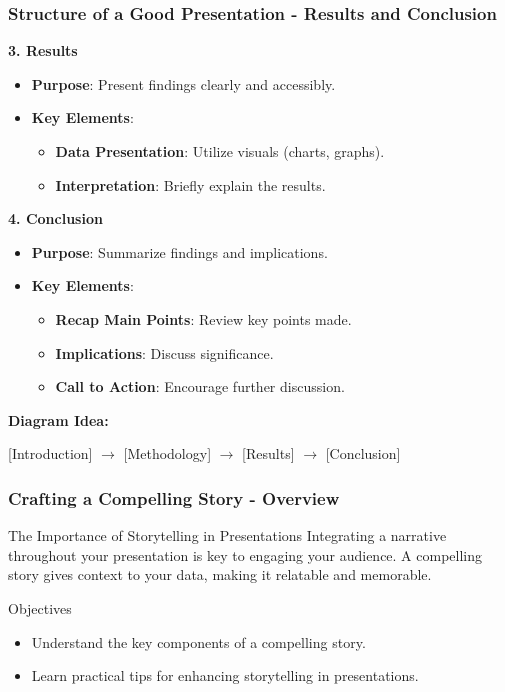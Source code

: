 \documentclass[aspectratio=169]{beamer}
\begin{document}
\begin{frame}[fragile]
    \frametitle{Structure of a Good Presentation - Results and Conclusion}
    
    \textbf{3. Results}
    \begin{itemize}
        \item \textbf{Purpose}: Present findings clearly and accessibly.
        \item \textbf{Key Elements}:
        \begin{itemize}
            \item \textbf{Data Presentation}: Utilize visuals (charts, graphs).
            \item \textbf{Interpretation}: Briefly explain the results.
        \end{itemize}
    \end{itemize}
    
    \textbf{4. Conclusion}
    \begin{itemize}
        \item \textbf{Purpose}: Summarize findings and implications.
        \item \textbf{Key Elements}:
        \begin{itemize}
            \item \textbf{Recap Main Points}: Review key points made.
            \item \textbf{Implications}: Discuss significance.
            \item \textbf{Call to Action}: Encourage further discussion.
        \end{itemize}
    \end{itemize}
    
    \textbf{Diagram Idea:} 
    \begin{center}
        [Introduction] $\rightarrow$ [Methodology] $\rightarrow$ [Results] $\rightarrow$ [Conclusion]
    \end{center}
\end{frame}

\begin{frame}[fragile]
    \frametitle{Crafting a Compelling Story - Overview}
    \begin{block}{The Importance of Storytelling in Presentations}
        Integrating a narrative throughout your presentation is key to engaging your audience. A compelling story gives context to your data, making it relatable and memorable.
    \end{block}
    \begin{block}{Objectives}
        \begin{itemize}
            \item Understand the key components of a compelling story.
            \item Learn practical tips for enhancing storytelling in presentations.
        \end{itemize}
    \end{block}
\end{frame}
\end{document}
